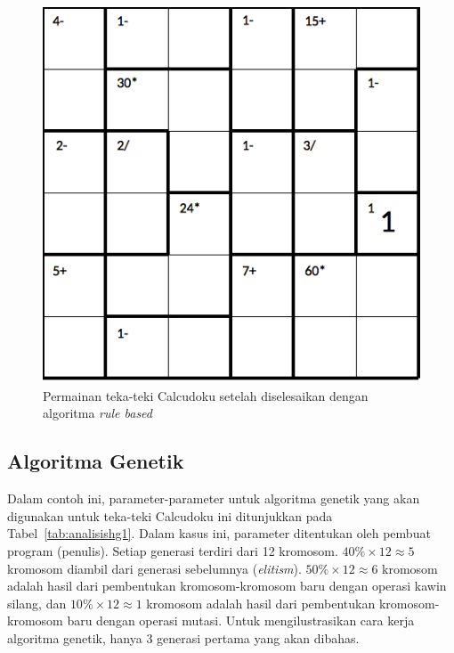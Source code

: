 \begin{figure}
\centering
\captionsetup{justification=centering}
\includegraphics[scale=0.333]{Gambar/hybridgenetic/PuzzleAfterRuleBased}
\caption[Permainan teka-teki Calcudoku setelah diselesaikan dengan algoritma \textit{rule based}]{Permainan teka-teki Calcudoku setelah diselesaikan dengan algoritma \textit{rule based}}
\label{fig:analisishg2}
\end{figure}

\subsection{Algoritma Genetik}
\label{sec:analisisgenetik}

Dalam contoh ini, parameter-parameter untuk algoritma genetik yang akan digunakan untuk teka-teki Calcudoku ini ditunjukkan pada Tabel~\ref{tab:analisishg1}. Dalam kasus ini, parameter ditentukan oleh pembuat program (penulis). Setiap generasi terdiri dari 12 kromosom. \begin{math}40\% \times 12 \approx 5\end{math} kromosom diambil dari generasi sebelumnya (\textit{elitism}). \begin{math}50\% \times 12 \approx 6\end{math} kromosom adalah hasil dari pembentukan kromosom-kromosom baru dengan operasi kawin silang, dan \begin{math}10\% \times 12 \approx 1\end{math} kromosom adalah hasil dari pembentukan kromosom-kromosom baru dengan operasi mutasi. Untuk mengilustrasikan cara kerja algoritma genetik, hanya 3 generasi pertama yang akan dibahas.

